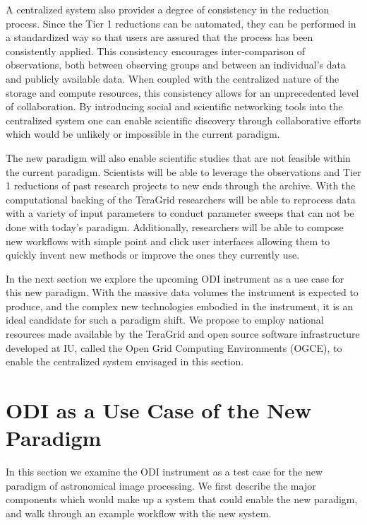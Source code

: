\documentclass[10pt,conference]{IEEEtran}
\begin{document}
A centralized system also provides a degree of consistency in the reduction process. Since the Tier 1 reductions can be automated, they can be performed in a standardized way so that users are assured that the process has been consistently applied. This consistency encourages inter-comparison of observations, both between observing groups and between an individual's data and publicly available data. When coupled with the centralized nature of the storage and compute resources, this consistency allows for an unprecedented level of collaboration. By introducing social and scientific networking tools into the centralized system one can enable scientific discovery through collaborative efforts which would be unlikely or impossible in the current paradigm.

The new paradigm will also enable scientific studies that are not feasible within the current paradigm. Scientists will be able to leverage the observations and Tier 1 reductions of past research projects to new ends through the archive. With the computational backing of the TeraGrid researchers will be able to reprocess data with a variety of input parameters to conduct parameter sweeps that can not be done with today's paradigm. Additionally, researchers will be able to compose new workflows with simple point and click user interfaces allowing them to quickly invent new methods or improve the ones they currently use. 

In the next section we explore the upcoming ODI instrument as a use case for this new paradigm. With the massive data volumes the instrument is expected to produce, and the complex new technologies embodied in the instrument, it is an ideal candidate for such a paradigm shift. We propose to employ national resources made available by the TeraGrid and open source software infrastructure developed at IU, called the Open Grid Computing Environments (OGCE), to enable the centralized system envisaged in this section. 

\section{ODI as a Use Case of the New Paradigm}\label{sec:ODI}

In this section we examine the ODI instrument as a test case for the new paradigm of astronomical image processing. We first describe the major components which would make up a system that could enable the new paradigm, and walk through an example workflow with the new system.
\end{document}
